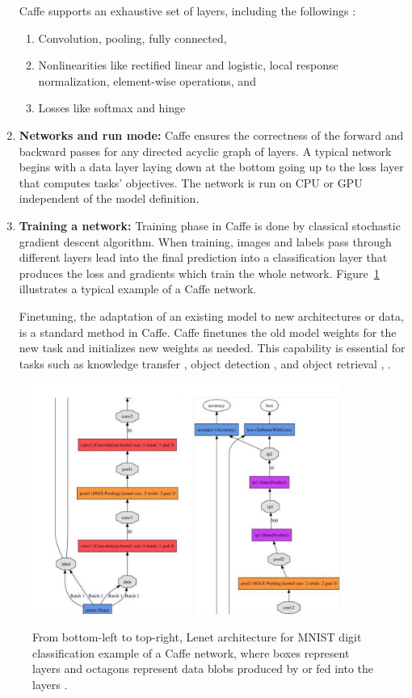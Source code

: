 \begin{enumerate}
\indent Caffe supports an exhaustive set of layers, including the followings \cite{jia2014caffe}: 
\begin{enumerate}
	\item Convolution, pooling, fully connected, 
	\item Nonlinearities like rectified
	linear and logistic, local response normalization, element-wise operations, and 
	\item Losses like softmax and hinge
\end{enumerate}
\item \textbf{Networks and run mode:} Caffe ensures the correctness of the forward and backward passes for any directed acyclic graph of layers. A typical network begins with a data layer laying down at the bottom going up to the loss layer that computes tasks' objectives. The network is run on CPU or GPU independent of the model definition. 
\item \textbf{Training a network:} Training phase in Caffe is done by classical stochastic gradient descent algorithm. When training, images and labels pass through different layers lead into the final prediction into a classification layer that produces the loss and gradients which train the whole network. Figure~\ref{fig:caffe} illustrates a typical example of a Caffe network. 


\indent Finetuning, the adaptation of an existing model to new architectures or data, is a standard method in Caffe. Caffe  finetunes the old model weights for the new task and initializes new weights as needed. This capability is essential for tasks such as knowledge transfer \cite{donahue2013decaf}, object detection \cite{girshick2014rich}, and object retrieval \cite{guadarrama2014open}, \cite{jia2014caffe}.  
\end{enumerate}


\begin{figure}[H]
	\centering
	{\includegraphics[width=0.9\textwidth]{images/le2col}}
	\caption{From bottom-left to top-right, Lenet architecture for MNIST digit classification example of a Caffe network, where boxes represent layers and octagons represent data blobs produced by or fed into the layers \cite{jia2014caffe}.}
	\label{fig:caffe}
\end{figure}

